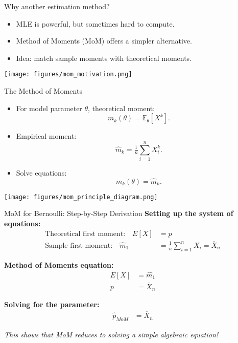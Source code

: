 
\begin{frame}{Why another estimation method?}
  \begin{itemize}
    \item MLE is powerful, but sometimes hard to compute.
    \item Method of Moments (MoM) offers a simpler alternative.
    \item Idea: match sample moments with theoretical moments.
  \end{itemize}
  \begin{center}
    \texttt{[image: figures/mom\_motivation.png]}
  \end{center}
\end{frame}

\begin{frame}{The Method of Moments}
  \begin{itemize}
    \item For model parameter $\theta$, theoretical moment:
      \[ m_k(\theta) = \mathbb{E}_\theta[X^k]. \]
    \item Empirical moment:
      \[ \hat{m}_k = \tfrac{1}{n}\sum_{i=1}^n X_i^k. \]
    \item Solve equations:
      \[ m_k(\theta) = \hat{m}_k. \]
  \end{itemize}
  \begin{center}
    \texttt{[image: figures/mom\_principle\_diagram.png]}
  \end{center}
\end{frame}

\begin{frame}{MoM for Bernoulli: Step-by-Step Derivation}
  \textbf{Setting up the system of equations:}
  \begin{align}
    \text{Theoretical first moment:} \quad E[X] &= p \\
    \text{Sample first moment:} \quad \hat{m}_1 &= \frac{1}{n}\sum_{i=1}^n X_i = \overline{X}_n
  \end{align}

  \vspace{0.3cm}
  \textbf{Method of Moments equation:}
  \begin{align}
    E[X] &= \hat{m}_1 \\
    p &= \overline{X}_n
  \end{align}

  \vspace{0.3cm}
  \textbf{Solving for the parameter:}
  \begin{align}
    \hat{p}_{MoM} &= \overline{X}_n
  \end{align}

  \vspace{0.2cm}
  \textit{This shows that MoM reduces to solving a simple algebraic equation!}
\end{frame}

